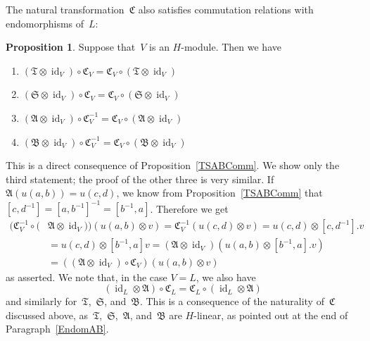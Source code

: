 \documentclass[12pt]{article}
\makeatletter
\newcounter{num}
\theoremstyle{definition}
\newtheorem{Proposition}[Satz]{Proposition}
\theoremstyle{break}
\renewenvironment{proof}[1][\proofname]{\par
\vspace{-5pt}%
\pushQED{\qed}%
\normalfont
\topsep0pt \partopsep0pt %
\trivlist
\item[\hskip\labelsep
\bfseries
#1\@addpunct{.}]\ignorespaces
}{%
\popQED\endtrivlist\@endpefalse
\addvspace{6pt plus 6pt} %
}
\DeclareMathOperator\id{id}
\newcommand{\fA}{\mathfrak{A}}
\newcommand{\fB}{\mathfrak{B}}
\newcommand{\fC}{\mathfrak{C}}
\newcommand{\fS}{\mathfrak{S}}
\newcommand{\fT}{\mathfrak{T}}
\renewcommand{\1}{\mathbbm{1}}
\newcommand{\ot}{\mathbin{\otimes}}
\newcommand{\uu}{u}
\makeatother
\begin{document}
The natural transformation~$\fC$ also satisfies commutation relations with endomorphisms of~$L$:
\begin{Proposition} \label{PropertC}
Suppose that~$V$ is an $H$-module. Then we have
\begin{enumerate}
\item
$(\fT \ot \id_V) \circ \fC_V = \fC_V \circ (\fT \ot \id_V)$

\item
$(\fS \ot \id_V) \circ \fC_V = \fC_V \circ (\fS \ot \id_V)$

\item
$(\fA \ot \id_V) \circ \fC_V^{-1} = \fC_V \circ (\fA \ot \id_V)$

\item
$(\fB \ot \id_V) \circ \fC_V^{-1} = \fC_V \circ (\fB \ot \id_V)$
\end{enumerate}
\end{Proposition}
\begin{proof}
This is a direct consequence of Proposition~\ref{TSABComm}. We show only the third statement; the proof of the other three is very similar. If
$\fA(u(a,b)) = u(c,d)$, we know from Proposition~\ref{TSABComm} that
$[c,d^{-1}] = [a,b^{-1}]^{-1} = [b^{-1},a]$. Therefore we get
\begin{align*}
(\fC_V^{-1} \circ (&\fA \ot \id_V))(\uu(a, b) \ot v) = \fC_V^{-1}(\uu(c,d) \ot v)
= \uu(c,d) \ot [c,d^{-1}].v \\
&= \uu(c,d) \ot [b^{-1},a]v = (\fA \ot \id_V)(\uu(a,b) \ot [b^{-1},a].v) \\
&= ((\fA \ot \id_V) \circ \fC_V)(\uu(a, b) \ot v)
\end{align*}
as asserted.
\end{proof}
We note that, in the case $V=L$, we also have
\[(\id_L \ot \fA) \circ \fC_L = \fC_L \circ(\id_L \ot \fA)\]
and similarly for~$\fT$,~$\fS$, and~$\fB$. This is a consequence of the naturality of~$\fC$ discussed above, as~$\fT$,~$\fS$,~$\fA$, and~$\fB$ are $H$-linear, as pointed out at the end of Paragraph~\ref{EndomAB}.
\end{document}
